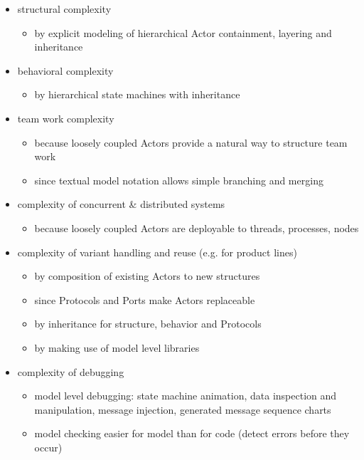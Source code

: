 \begin{itemize}
\item structural complexity
	\begin{itemize}
	\item by explicit modeling of hierarchical Actor containment, layering and inheritance
	\end{itemize}
\item behavioral complexity
	\begin{itemize}
	\item by hierarchical state machines with inheritance
	\end{itemize}
\item team work complexity
	\begin{itemize}
	\item because loosely coupled Actors provide a natural way to structure team work
	\item since textual model notation allows simple branching and merging
	\end{itemize}
\item complexity of concurrent \& distributed systems
	\begin{itemize}
	\item because loosely coupled Actors are deployable to threads, processes, nodes
	\end{itemize}
\item complexity of variant handling and reuse (e.g. for product lines)
	\begin{itemize}
	\item by composition of existing Actors to new structures
	\item since Protocols and Ports make Actors replaceable
	\item by inheritance for structure, behavior and Protocols
	\item by making use of model level libraries 
	\end{itemize}
\item complexity of debugging
	\begin{itemize}
	\item model level debugging: state machine animation, data inspection and manipulation, message injection, 
	generated message sequence charts
	\item model checking easier for model than for code (detect errors before they occur)
	\end{itemize}
\end{itemize}
